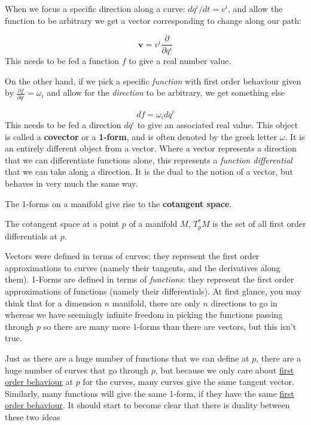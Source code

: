 	When we focus a specific direction along a curve: $dq^i/dt = v^i$, and allow the function to be arbitrary we get a vector corresponding to change along our path:
	
	\begin{equation}
		\mathbf v  = v^i \frac{\partial}{\partial q^i} 
	\end{equation}
	This needs to be fed a function $f$ to give a real number value.
	
	On the other hand, if we pick a specific \emph{function} with first order behaviour given by $\frac{\partial f}{\partial q^i} = \omega_i$ and allow for the \emph{direction} to be arbitrary, we get something else
	
	\begin{equation}
		df = \omega_i dq^i
	\end{equation}
	This needs to be fed a direction $dq^i$ to give an associated real value. This object is called a \textbf{covector} or a \textbf{1-form}, and is often denoted by the greek letter $\omega$. It is an entirely different object from a vector. Where a vector represents a direction that we can differentiate functions alone, this represents a \emph{function differential} that we can take along a direction. It is the dual to the notion of a vector, but behaves in very much the same way.
	
	The 1-forms on a manifold give rise to the \textbf{cotangent space}.
	
	\begin{defn}
		The cotangent space at a point $p$ of a manifold $M$, $T_p^* M$ is the set of all first order differentials at $p$.
	\end{defn}
	
	Vectors were defined in terms of curves: they represent the first order approximations to curves (namely their tangents, and the derivatives along them). 1-Forms are defined in terms of \emph{functions}: they represent the first order approximations of functions (namely their differentials). At first glance, you may think that for a dimension $n$ manifold, there are only $n$ directions to go in whereas we have seemingly infinite freedom in picking the functions passing through $p$ so there are many more 1-forms than there are vectors, but this isn't true.
	
	Just as there are a huge number of functions that we can define at $p$, there are a huge number of curves that go through $p$, but because we only care about \underline{first order behaviour} at $p$ for the curves, many curves give the same tangent vector. Similarly, many functions will give the same 1-form, if they have the same \underline{first order behaviour}. It should start to become clear that there is duality between these two ideas
	
